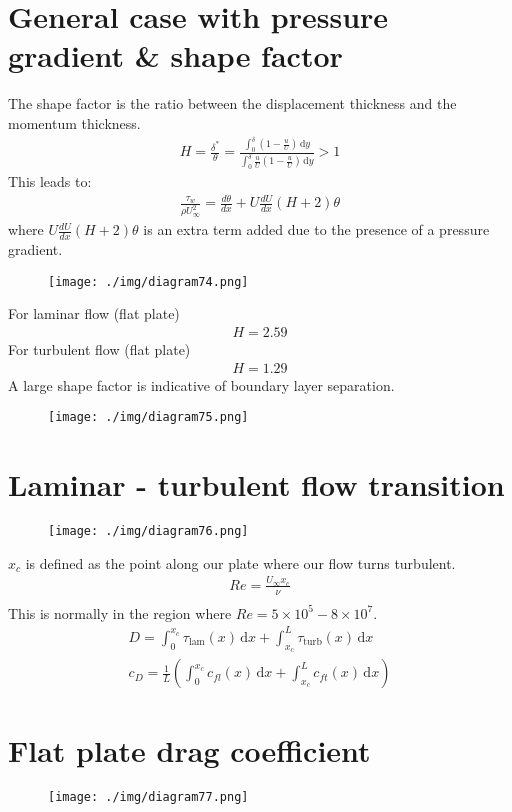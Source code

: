\section{General case with pressure gradient \& shape factor}
The shape factor is the ratio between the displacement thickness and the momentum thickness.
\begin{align}
  H = \frac{\delta^*}{\theta} = \frac{\int_{0}^{\delta} \left(1 - \frac{u}{U}\right) \,\mathrm{d}y}{\int_{0}^{\delta} \frac{u}{U} \left(1 - \frac{u}{U}\right) \,\mathrm{d}y} > 1
\end{align}
This leads to:
\begin{align}
  \frac{\tau_w}{\rho U_\infty^2} = \frac{d\theta}{dx} + U \frac{dU}{dx} (H + 2)\theta
\end{align}
where $U \frac{dU}{dx} (H + 2)\theta$ is an extra term added due to the presence of a pressure gradient.
\begin{figure}[H]
  \centering
  \texttt{[image: ./img/diagram74.png]}
  \caption{}
\end{figure}
For laminar flow (flat plate)
\begin{align}
  H = 2.59
\end{align}
For turbulent flow (flat plate)
\begin{align}
  H = 1.29
\end{align}
A large shape factor is indicative of boundary layer separation.
\begin{figure}[H]
  \centering
  \texttt{[image: ./img/diagram75.png]}
  \caption{}
\end{figure}
\section{Laminar - turbulent flow transition}
\begin{figure}[H]
  \centering
  \texttt{[image: ./img/diagram76.png]}
  \caption{}
\end{figure}
$x_c$ is defined as the point along our plate where our flow turns turbulent.
\begin{gather}
  Re = \frac{U_\infty x_c}{\nu}\\
\end{gather}
This is normally in the region where $Re = 5 \times 10^5 - 8\times 10^7$.
\begin{align}
  D = \int_{0}^{x_c} \tau_{\textrm{lam}} (x) \,\mathrm{d}x + \int_{x_c}^{L} \tau_{\textrm{turb}} (x) \,\mathrm{d}x \\
  c_D = \frac{1}{L} \left( \int_{0}^{x_c} c_{fl} (x) \,\mathrm{d}x + \int_{x_c}^{L} c_{ft} (x) \,\mathrm{d}x  \right)
\end{align}
\section{Flat plate drag coefficient}
\begin{figure}[H]
  \centering
  \texttt{[image: ./img/diagram77.png]}
  \caption{}
\end{figure}